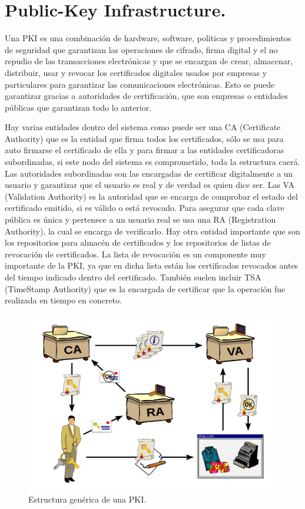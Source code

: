 \section{Public-Key Infrastructure.}

Una PKI es una combinación de hardware, software, políticas y procedimientos de seguridad que garantizan las operaciones de cifrado, firma digital y el no repudio de las transacciones electrónicas y que se encargan de crear, almacenar, distribuir, usar y revocar los certificados digitales usados por empresas y particulares para garantizar las comunicaciones electrónicas. Esto se puede garantizar gracias a autoridades de certificación, que son empresas o entidades públicas que garantizan todo lo anterior.

Hay varias entidades dentro del sistema como puede ser una CA (Certificate Authority) que es la entidad que firma todos los certificados, sólo se usa para auto firmarse el certificado de ella y para firmar a las entidades certificadoras subordinadas, si este nodo del sistema es comprometido, toda la estructura caerá. Las autoridades subordinadas son las encargadas de certificar digitalmente a un usuario y garantizar que el usuario es real y de verdad es quien dice ser.  Las VA (Validation Authority) es la autoridad que se encarga de comprobar el estado del certificado emitido, si es válido o está revocado. Para asegurar que cada clave pública es única y pertenece a un usuario real se usa una RA (Registration Authority), la cual se encarga de verificarlo. Hay otra entidad importante que son los repositorios para almacén de certificados y los repositorios de listas de revocación de certificados. La lista de revocación es un componente muy importante de la PKI, ya que en dicha lista están los certificados revocados antes del tiempo indicado dentro del certificado. También suelen incluir TSA (TimeStamp Authority) que es la encargada de certificar que la operación fue realizada en tiempo en concreto.

\begin{figure}
  \centering
    \includegraphics[scale=0.3]{./Criptografia/imagenes/esquemaPKI.png}
  \caption{Estructura genérica de una PKI.}
  \label{fig:esquemaPKI}
\end{figure} 

